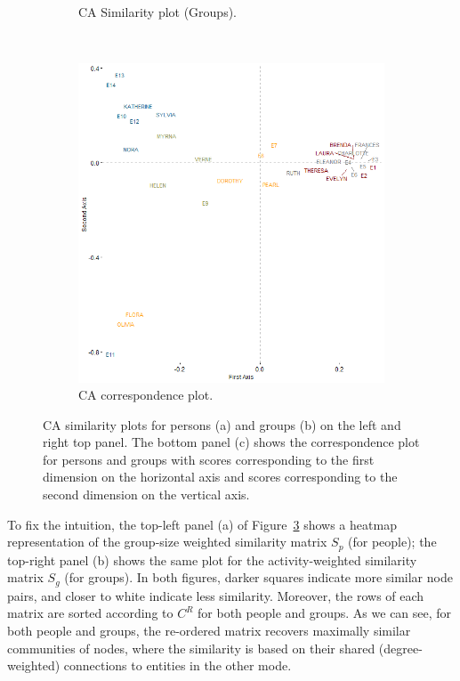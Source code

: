\documentclass[a4paper,fleqn]{cas-sc}
\begin{document}
\begin{figure}
\begin{subfigure}[b]{0.4\textwidth}
            \caption{CA Similarity plot (Groups).}
            \label{fig:g-ca-sim}
    \end{subfigure} \\
     \begin{subfigure}[b]{0.65\textwidth}
        \includegraphics[width=1.0\textwidth]{Plots/ca-corr-plot.png}
            \caption{CA correspondence plot.}
            \label{fig:ca-corr}
    \end{subfigure}
    \caption{CA similarity plots for persons (a) and groups (b) on the left and right top panel. The bottom panel (c) shows the correspondence plot for persons and groups with scores corresponding to the first dimension on the horizontal axis and scores corresponding to the second dimension on the vertical axis.}
    \label{fig:ca-sim}
\end{figure}

To fix the intuition, the top-left panel (a) of Figure~\ref{fig:ca-sim} shows a heatmap representation of the group-size weighted similarity matrix $S_p$ (for people); the top-right panel (b) shows the same plot for the activity-weighted similarity matrix $S_g$ (for groups). In both figures, darker squares indicate more similar node pairs, and closer to white indicate less similarity. Moreover, the rows of each matrix are sorted according to $C^R$ for both people and groups. As we can see, for both people and groups, the re-ordered matrix recovers maximally similar communities of nodes, where the similarity is based on their shared (degree-weighted) connections to entities in the other mode. 
\end{document}
